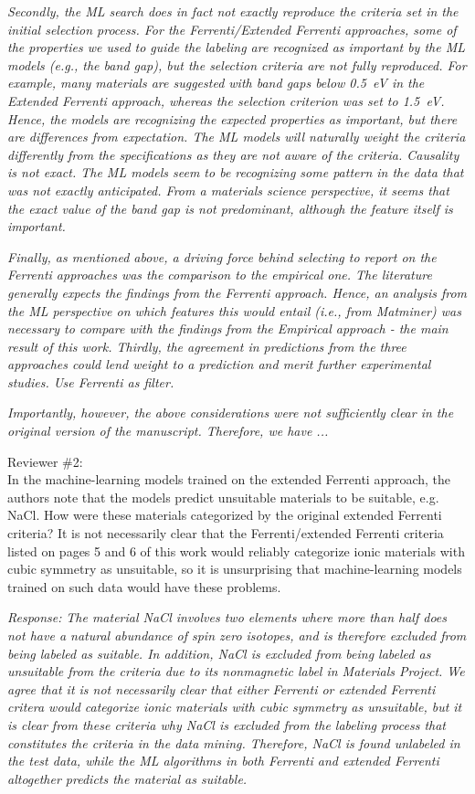 \documentclass[11pt, a4paper]{letter} %
\begin{document}
\textit{Secondly, the ML search does in fact not exactly reproduce the criteria set in the initial selection process. For the Ferrenti/Extended Ferrenti approaches, some of the properties we used to guide the labeling are recognized as important by the ML models (e.g., the band gap), but the selection criteria are not fully reproduced. For example, many materials are suggested with band gaps below 0.5~eV in the Extended Ferrenti approach, whereas the selection criterion was set to 1.5~eV. Hence, the models are recognizing the expected properties as important, but there are differences from expectation. The ML models will naturally weight the criteria differently from the specifications as they are not aware of the criteria. Causality is not exact.  
The ML models seem to be recognizing some pattern in the data that was not exactly anticipated. From a materials science perspective, it seems that the exact value of the band gap is not predominant, although the feature itself is important. }

\textit{Finally, as mentioned above, a driving force behind selecting to report on the Ferrenti approaches was the comparison to the empirical one. The literature generally expects the findings from the Ferrenti approach. Hence, an analysis from the ML perspective on which features this would entail (i.e., from Matminer) was necessary to compare with the findings from the Empirical approach - the main result of this work. Thirdly, the agreement in predictions from the three approaches could lend weight to a prediction and merit further experimental studies. Use Ferrenti as filter. }

\textit{Importantly, however, the above considerations were not sufficiently clear in the original version of the manuscript. Therefore, we have ... }


Reviewer \#2: \\
In the machine-learning models trained on the extended Ferrenti approach, the authors note that the models predict unsuitable materials to be suitable, e.g. NaCl. How were these materials categorized by the original extended Ferrenti criteria? It is not necessarily clear that the Ferrenti/extended Ferrenti criteria listed on pages 5 and 6 of this work would reliably categorize ionic materials with cubic symmetry as unsuitable, so it is unsurprising that machine-learning models trained on such data would have these problems.

\textit{Response:} 
\textit{The material NaCl involves two elements where more than half does not have a natural abundance of spin zero isotopes, and is therefore excluded from being labeled as suitable. In addition, NaCl is excluded from being labeled as unsuitable from the criteria due to its nonmagnetic label in Materials Project. We agree that it is not necessarily clear that either Ferrenti or extended Ferrenti critera would categorize ionic materials with cubic symmetry as unsuitable, but it is clear from these criteria why NaCl is excluded from the labeling process that constitutes the criteria in the data mining. Therefore, NaCl is found unlabeled in the test data, while the ML algorithms in both Ferrenti and extended Ferrenti altogether predicts the material as suitable.}  
\end{document}
